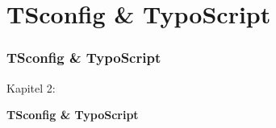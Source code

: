 %

\section{TSconfig \& TypoScript}
\begin{frame}[fragile]
	\frametitle{TSconfig \& TypoScript}

	\begin{center}\huge{Kapitel 2:}\end{center}
	\begin{center}\huge{\color{typo3darkgrey}\textbf{TSconfig \& TypoScript}}\end{center}

\end{frame}


